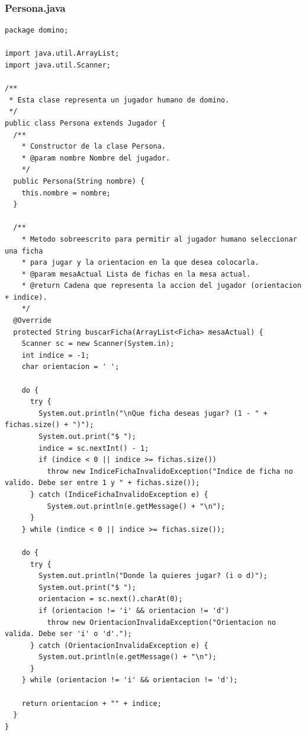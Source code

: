 \documentclass[12pt]{article}
\begin{document}
  \subsubsection{Persona.java}
  \begin{lstlisting}
package domino;

import java.util.ArrayList;
import java.util.Scanner;

/**
 * Esta clase representa un jugador humano de domino.
 */
public class Persona extends Jugador {
  /**
    * Constructor de la clase Persona.
    * @param nombre Nombre del jugador.
    */
  public Persona(String nombre) {
    this.nombre = nombre;
  }

  /**
    * Metodo sobreescrito para permitir al jugador humano seleccionar una ficha
    * para jugar y la orientacion en la que desea colocarla.
    * @param mesaActual Lista de fichas en la mesa actual.
    * @return Cadena que representa la accion del jugador (orientacion + indice).
    */
  @Override
  protected String buscarFicha(ArrayList<Ficha> mesaActual) {
    Scanner sc = new Scanner(System.in);
    int indice = -1;
    char orientacion = ' ';

    do {
      try {
        System.out.println("\nQue ficha deseas jugar? (1 - " + fichas.size() + ")");
        System.out.print("$ ");
        indice = sc.nextInt() - 1;
        if (indice < 0 || indice >= fichas.size())
          throw new IndiceFichaInvalidoException("Indice de ficha no valido. Debe ser entre 1 y " + fichas.size());
      } catch (IndiceFichaInvalidoException e) {
          System.out.println(e.getMessage() + "\n");
      }
    } while (indice < 0 || indice >= fichas.size());
    
    do {
      try {
        System.out.println("Donde la quieres jugar? (i o d)");
        System.out.print("$ ");
        orientacion = sc.next().charAt(0);
        if (orientacion != 'i' && orientacion != 'd') 
          throw new OrientacionInvalidaException("Orientacion no valida. Debe ser 'i' o 'd'.");
      } catch (OrientacionInvalidaException e) {
        System.out.println(e.getMessage() + "\n");
      }
    } while (orientacion != 'i' && orientacion != 'd');

    return orientacion + "" + indice;
  }
}
  \end{lstlisting}
\end{document}
